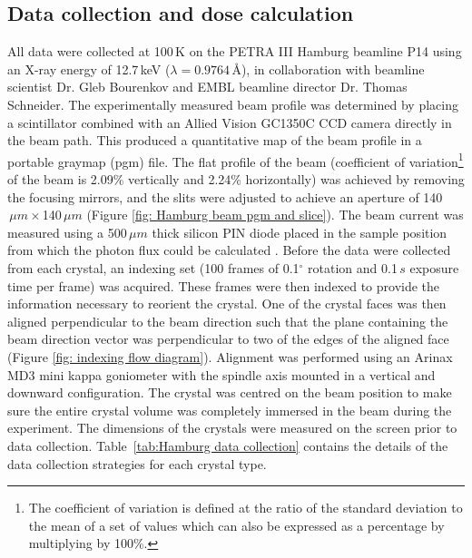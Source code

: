 \subsection{Data collection and dose calculation}
\label{sub:Data Collection and Dose Calculation}
All data were collected at 100\,K on the PETRA III Hamburg beamline P14 using an X-ray energy of 12.7\,keV ($\lambda = \text{0.9764}\,$\AA), in collaboration with beamline scientist Dr. Gleb Bourenkov and EMBL beamline director Dr. Thomas Schneider.
The experimentally measured beam profile was determined by placing a scintillator combined with an Allied Vision GC1350C CCD camera directly in the beam path.
This produced a quantitative map of the beam profile in a portable graymap (pgm) file.
The flat profile of the beam (coefficient of variation\footnote{The coefficient of variation is defined at the ratio of the standard deviation to the mean of a set of values which can also be expressed as a percentage by multiplying by 100\%.} of the beam is 2.09\% vertically and  2.24\% horizontally) was achieved by removing the focusing mirrors, and the slits were adjusted to achieve an aperture of 140$\,\mu m \times $140$\,\mu m$ (Figure \ref{fig: Hamburg beam pgm and slice}).
The beam current was measured using a 500$\,\mu m$ thick silicon PIN diode placed in the sample position from which the photon flux could be calculated \cite{owen2009}.
Before the data were collected from each crystal, an indexing set (100 frames of 0.1$^{\circ}$ rotation and 0.1$\,s$ exposure time per frame) was acquired.
These frames were then indexed to provide the information necessary to reorient the crystal.
One of the crystal faces was then aligned perpendicular to the beam direction such that the plane containing the beam direction vector was perpendicular to two of the edges of the aligned face (Figure \ref{fig: indexing flow diagram}).
Alignment was performed using an Arinax MD3 mini kappa goniometer with the spindle axis mounted in a vertical and downward configuration.
The crystal was centred on the beam position to make sure the entire crystal volume was completely immersed in the beam during the experiment.
The dimensions of the crystals were measured on the screen prior to data collection.
Table~\ref{tab:Hamburg data collection} contains the details of the data collection strategies for each crystal type.

